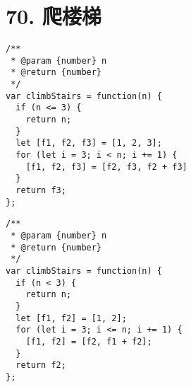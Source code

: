 \newpage
\section{70. 爬楼梯}
\label{leetcode:70}

\begin{verbatim}
/**
 * @param {number} n
 * @return {number}
 */
var climbStairs = function(n) {
  if (n <= 3) {
    return n;
  }
  let [f1, f2, f3] = [1, 2, 3];
  for (let i = 3; i < n; i += 1) {
    [f1, f2, f3] = [f2, f3, f2 + f3]
  }
  return f3;
};
\end{verbatim}

\begin{verbatim}
/**
 * @param {number} n
 * @return {number}
 */
var climbStairs = function(n) {
  if (n < 3) {
    return n;
  }
  let [f1, f2] = [1, 2];
  for (let i = 3; i <= n; i += 1) {
    [f1, f2] = [f2, f1 + f2];
  }
  return f2;
};
\end{verbatim}